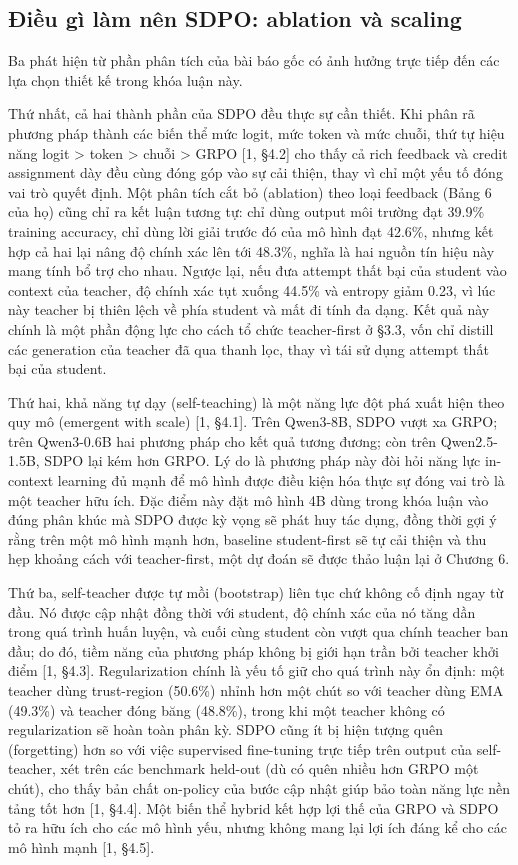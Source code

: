\subsection{Điều gì làm nên SDPO: ablation và scaling}\label{what-drives-sdpo-ablations-and-scaling}

Ba phát hiện từ phần phân tích của bài báo gốc có ảnh hưởng trực tiếp đến các lựa chọn thiết kế trong khóa luận này.

Thứ nhất, cả hai thành phần của SDPO đều thực sự cần thiết. Khi phân rã phương pháp thành các biến thể mức logit, mức token và mức chuỗi, thứ tự hiệu năng logit \textgreater{} token \textgreater{} chuỗi \textgreater{} GRPO {[}1, §4.2{]} cho thấy cả rich feedback và credit assignment dày đều cùng đóng góp vào sự cải thiện, thay vì chỉ một yếu tố đóng vai trò quyết định. Một phân tích cắt bỏ (ablation) theo loại feedback (Bảng 6 của họ) cũng chỉ ra kết luận tương tự: chỉ dùng output môi trường đạt 39.9\% training accuracy, chỉ dùng lời giải trước đó của mô hình đạt 42.6\%, nhưng kết hợp cả hai lại nâng độ chính xác lên tới 48.3\%, nghĩa là hai nguồn tín hiệu này mang tính bổ trợ cho nhau. Ngược lại, nếu đưa attempt thất bại của student vào context của teacher, độ chính xác tụt xuống 44.5\% và entropy giảm 0.23, vì lúc này teacher bị thiên lệch về phía student và mất đi tính đa dạng. Kết quả này chính là một phần động lực cho cách tổ chức teacher-first ở §3.3, vốn chỉ distill các generation của teacher đã qua thanh lọc, thay vì tái sử dụng attempt thất bại của student.

Thứ hai, khả năng tự dạy (self-teaching) là một năng lực đột phá xuất hiện theo quy mô (emergent with scale) {[}1, §4.1{]}. Trên Qwen3-8B, SDPO vượt xa GRPO; trên Qwen3-0.6B hai phương pháp cho kết quả tương đương; còn trên Qwen2.5-1.5B, SDPO lại kém hơn GRPO. Lý do là phương pháp này đòi hỏi năng lực in-context learning đủ mạnh để mô hình được điều kiện hóa thực sự đóng vai trò là một teacher hữu ích. Đặc điểm này đặt mô hình 4B dùng trong khóa luận vào đúng phân khúc mà SDPO được kỳ vọng sẽ phát huy tác dụng, đồng thời gợi ý rằng trên một mô hình mạnh hơn, baseline student-first sẽ tự cải thiện và thu hẹp khoảng cách với teacher-first, một dự đoán sẽ được thảo luận lại ở Chương 6.

Thứ ba, self-teacher được tự mồi (bootstrap) liên tục chứ không cố định ngay từ đầu. Nó được cập nhật đồng thời với student, độ chính xác của nó tăng dần trong quá trình huấn luyện, và cuối cùng student còn vượt qua chính teacher ban đầu; do đó, tiềm năng của phương pháp không bị giới hạn trần bởi teacher khởi điểm {[}1, §4.3{]}. Regularization chính là yếu tố giữ cho quá trình này ổn định: một teacher dùng trust-region (50.6\%) nhỉnh hơn một chút so với teacher dùng EMA (49.3\%) và teacher đóng băng (48.8\%), trong khi một teacher không có regularization sẽ hoàn toàn phân kỳ. SDPO cũng ít bị hiện tượng quên (forgetting) hơn so với việc supervised fine-tuning trực tiếp trên output của self-teacher, xét trên các benchmark held-out (dù có quên nhiều hơn GRPO một chút), cho thấy bản chất on-policy của bước cập nhật giúp bảo toàn năng lực nền tảng tốt hơn {[}1, §4.4{]}. Một biến thể hybrid kết hợp lợi thế của GRPO và SDPO tỏ ra hữu ích cho các mô hình yếu, nhưng không mang lại lợi ích đáng kể cho các mô hình mạnh {[}1, §4.5{]}.

